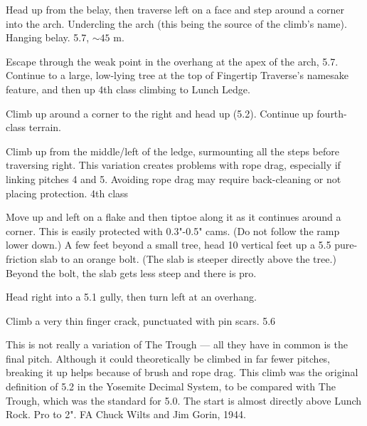 \documentclass{tahquitz}
\begin{document}
 Head up from the belay, then traverse left on a face and
step around a corner into the arch. Undercling the arch (this being
the source of the climb's name). Hanging belay. 5.7, $\sim45$ m.

 Escape through the weak point in the overhang at the apex
of the arch, 5.7. Continue to a large, low-lying tree at the top of Fingertip Traverse's
namesake feature, and then up 4th class climbing to Lunch Ledge.


 Climb up around a corner to the right and head up (5.2).
Continue up fourth-class terrain.

 Climb up from the middle/left of the ledge, surmounting all the steps
before traversing right. This variation creates problems with rope drag, especially
if linking pitches 4 and 5. Avoiding rope drag may require back-cleaning or not
placing protection. 4th class

 Move up and left on a flake and then tiptoe along it as it
continues around a corner.  This is easily protected with 0.3"-0.5"
cams. (Do not follow the ramp lower down.)  A few feet beyond a small
tree, head 10 vertical feet up a 5.5 pure-friction slab to an orange bolt. (The slab
is steeper directly above the tree.) Beyond the bolt, the slab gets
less steep and there is pro. 

 Head right into a 5.1 gully, then turn left at an overhang.

 Climb a very thin finger crack, punctuated with pin scars. 5.6

\somespace

\upfriction



This is not really a variation of The Trough --- all they have in common
is the final pitch. Although it could theoretically be climbed in far fewer pitches,
breaking it up helps because of brush and rope drag.
This climb was the original definition of 5.2 in the Yosemite Decimal System, to
be compared with The Trough, which was the standard for 5.0.
The start is almost directly above Lunch Rock. Pro to 2".
FA Chuck Wilts and Jim Gorin, 1944.

\somespace
\end{document}

